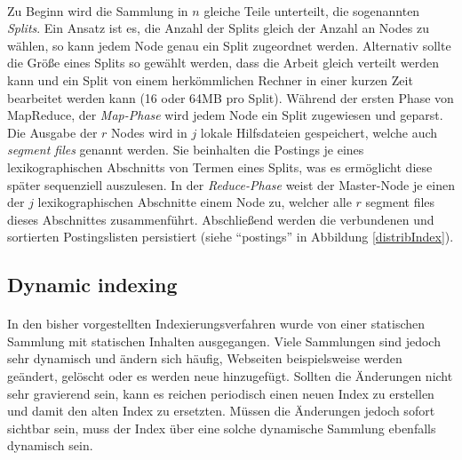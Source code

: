 \paragraph{}
Zu Beginn wird die Sammlung in $n$ gleiche Teile unterteilt, die sogenannten \textit{Splits}. Ein Ansatz ist es, die Anzahl der Splits gleich der Anzahl an Nodes zu wählen, so kann jedem Node genau ein Split zugeordnet werden. Alternativ sollte die Größe eines Splits so gewählt werden, dass die Arbeit gleich verteilt werden kann und ein Split von einem herkömmlichen Rechner in einer kurzen Zeit bearbeitet werden kann (16 oder 64MB pro Split). Während der ersten Phase von MapReduce, der \textit{Map-Phase} wird jedem Node ein Split zugewiesen und geparst. Die Ausgabe der $r$ Nodes wird in $j$ lokale Hilfsdateien gespeichert, welche auch \textit{segment files} genannt werden. Sie beinhalten die Postings je eines lexikographischen Abschnitts von Termen eines Splits, was es ermöglicht diese später sequenziell auszulesen. In der \textit{Reduce-Phase} weist der Master-Node je einen der $j$ lexikographischen Abschnitte einem Node zu, welcher alle $r$ segment files dieses Abschnittes zusammenführt. Abschließend werden die verbundenen und sortierten Postingslisten persistiert (siehe \enquote{postings} in Abbildung \ref{distribIndex}).\par

\subsection{Dynamic indexing}
\paragraph{}
In den bisher vorgestellten Indexierungsverfahren wurde von einer statischen Sammlung mit statischen Inhalten ausgegangen. Viele Sammlungen sind jedoch sehr dynamisch und ändern sich häufig, Webseiten beispielsweise werden geändert, gelöscht oder es werden neue hinzugefügt. Sollten die Änderungen nicht sehr gravierend sein, kann es reichen periodisch einen neuen Index zu erstellen und damit den alten Index zu ersetzten. Müssen die Änderungen jedoch sofort sichtbar sein, muss der Index über eine solche dynamische Sammlung ebenfalls dynamisch sein.\par

